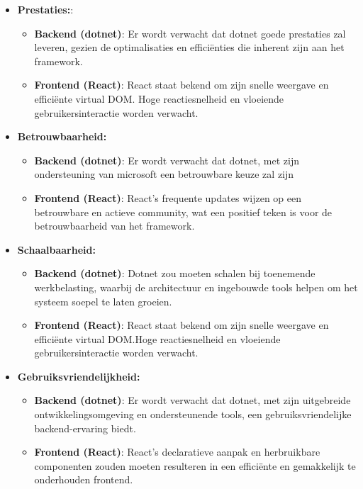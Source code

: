 \documentclass{hogent-article}
\begin{document}
\begin{itemize}
  \item \textbf{Prestaties:}:
    \begin{itemize}
      \item \textbf{Backend (dotnet)}: Er wordt verwacht dat dotnet goede prestaties zal leveren, gezien de optimalisaties en efficiënties die inherent zijn aan het framework.
      \item \textbf{Frontend (React)}: React staat bekend om zijn snelle weergave en efficiënte virtual DOM.  Hoge reactiesnelheid en vloeiende gebruikersinteractie worden verwacht.
    \end{itemize}
  \item \textbf{Betrouwbaarheid:}
    \begin{itemize}
      \item \textbf{Backend (dotnet)}: Er wordt verwacht dat dotnet, met zijn ondersteuning van microsoft een betrouwbare keuze zal zijn
      \item \textbf{Frontend (React)}: React's frequente updates wijzen op een betrouwbare en actieve community, wat een positief teken is voor de betrouwbaarheid van het framework.
    \end{itemize}
  \item \textbf{Schaalbaarheid:}
    \begin{itemize}
      \item \textbf{Backend (dotnet)}: Dotnet zou moeten schalen bij toenemende werkbelasting, waarbij de architectuur en ingebouwde tools helpen om het systeem soepel te laten groeien.
      \item \textbf{Frontend (React)}: React staat bekend om zijn snelle weergave en efficiënte virtual DOM.Hoge reactiesnelheid en vloeiende gebruikersinteractie worden verwacht.
    \end{itemize}
  \item \textbf{Gebruiksvriendelijkheid:}
    \begin{itemize}
      \item \textbf{Backend (dotnet)}: Er wordt verwacht dat dotnet, met zijn uitgebreide ontwikkelingsomgeving en ondersteunende tools, een gebruiksvriendelijke backend-ervaring biedt.
      \item \textbf{Frontend (React)}: React's declaratieve aanpak en herbruikbare componenten zouden moeten resulteren in een efficiënte en gemakkelijk te onderhouden frontend.
    \end{itemize}
\end{itemize}
\end{document}
